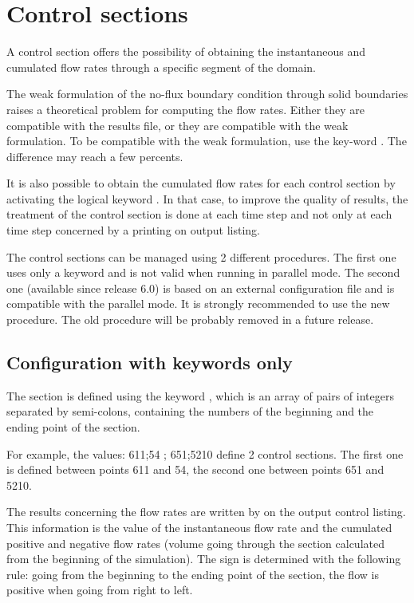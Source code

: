 \section{ Control sections}
\label{sec:contr:sect}
 A control section offers the possibility of obtaining the instantaneous and cumulated flow rates through a specific segment of the domain.

 The weak formulation of the no-flux boundary condition through solid boundaries raises a theoretical problem for computing the flow rates. Either they are compatible with the results file, or they are compatible with the weak formulation. To be compatible with the weak formulation, use the key-word . The difference may reach a few percents.

 It is also possible to obtain the cumulated flow rates for each control section by activating the logical keyword . In that case, to improve the quality of results, the treatment of the control section is done at each time step and not only at each time step concerned by a printing on output listing.

 The control sections can be managed using 2 different procedures. The first one uses only a keyword and is not valid when running in parallel mode. The second one (available since release 6.0) is based on an external configuration file and is compatible with the parallel mode. It is strongly recommended to use the new procedure. The old procedure will be probably removed in a future release.


\subsection{ Configuration with keywords only}

 The section is defined using the keyword , which is an array of pairs of integers separated by semi-colons, containing the numbers of the beginning and the ending point of the section.

 For example, the values: 611;54 ; 651;5210 define 2 control sections. The first one is defined between points 611 and 54, the second one between points 651 and 5210.

 The results concerning the flow rates are written by  on the output control listing. This information is the value of the instantaneous flow rate and the cumulated positive and negative flow rates (volume going through the section calculated from the beginning of the simulation). The sign is determined with the following rule: going from the beginning to the ending point of the section, the flow is positive when going from right to left.

